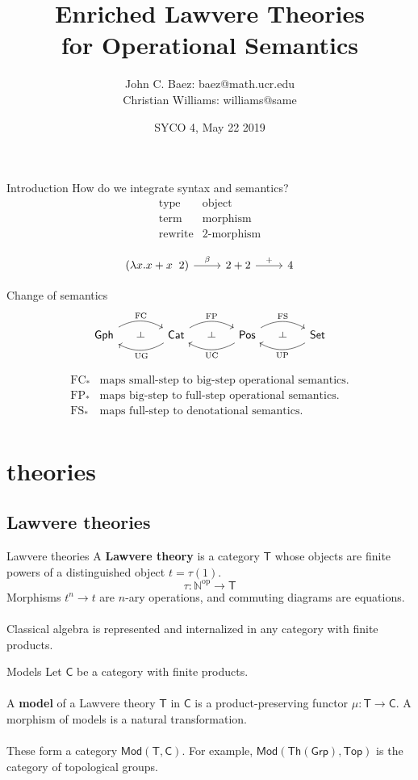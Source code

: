 \documentclass{beamer}
\title{Enriched Lawvere Theories\\ for Operational Semantics}
\author{John C. Baez: baez@math.ucr.edu\\ Christian Williams: williams@same}
\institute{University of California, Riverside}
\date{SYCO 4, May 22 2019}
\def\ld{\rotatebox[origin=c]{-90}{$\dashv$}} %
\newcommand{\Th}{\mathsf{Th}}
\newcommand{\Gph}{\mathsf{Gph}}
\newcommand{\Set}{\mathsf{Set}}
\newcommand{\Grp}{\mathsf{Grp}}
\newcommand{\Cat}{\mathsf{Cat}}
\newcommand{\Top}{\mathsf{Top}}
\newcommand{\Pos}{\mathsf{Pos}}
\newcommand{\Mod}{\mathsf{Mod}}
\newcommand{\C}{\mathsf{C}}
\newcommand{\T}{\mathsf{T}}
\newcommand{\FC}{\mathrm{FC}}
\newcommand{\FP}{\mathrm{FP}}
\newcommand{\FS}{\mathrm{FS}}
\newcommand{\UC}{\mathrm{UC}}
\newcommand{\UP}{\mathrm{UP}}
\newcommand{\UG}{\mathrm{UG}}
\newcommand{\op}{\mathrm{op}}
\newcommand{\maps}{\colon}
\begin{document}
\frame{\titlepage}

\begin{frame}{Introduction}
  How do we integrate syntax and semantics?
  \[\begin{array}{ll}
      \text{type} & \text{object}\\
      \text{term} & \text{morphism}\\
      \text{rewrite} & \text{2-morphism}\\
    \end{array}\]
  \[\begin{tikzcd}[ampersand replacement=\&]
      (\lambda x.x+x \; \; 2) \ar{r}{\beta} \& 2+2 \ar{r}{+} \& 4
    \end{tikzcd}\]
\end{frame}
\begin{frame}{Change of semantics}
  \[\begin{tikzcd}[column sep=small, ampersand replacement=\&]
\Gph \arrow[bend left,below]{rr}{\FC}
\& \ld \&
\arrow[bend left,above]{ll}{\UG} \Cat \arrow[bend left,below]{rr}{\FP}
\& \ld \&
\arrow[bend left,above]{ll}{\UC} \Pos \arrow[bend left,below]{rr}{\FS}
\& \ld \&
\Set \arrow[bend left,above]{ll}{\UP}
\end{tikzcd}\]

\[\begin{array}{ll}
    \FC_* & \text{maps small-step to big-step operational semantics.}\\
    \FP_* & \text{maps big-step to full-step operational semantics.}\\
    \FS_* & \text{maps full-step to denotational semantics.}\\
\end{array}\]

\end{frame}

\section{theories}
\subsection{Lawvere theories}
\begin{frame}{Lawvere theories}
  A \textbf{Lawvere theory} is a category $\T$ whose objects are finite powers of a distinguished object $t = \tau(1)$.
  $$\tau\maps \mathbb{N}^{\op}\to \T$$
  Morphisms $t^n\to t$ are $n$-ary operations, and commuting diagrams are equations.\\~\\
  Classical algebra is represented and internalized in any category with finite products.
\end{frame}
\begin{frame}{Models}
  Let $\C$ be a category with finite products.\\~\\
  A \textbf{model} of a Lawvere theory $\T$ in $\C$ is a product-preserving functor $\mu\maps \T\to \C$. A morphism of models is a natural transformation. \\~\\
  These form a category $\Mod(\T,\C)$. For example, $\Mod(\Th(\Grp),\Top)$ is the category of topological groups.
\end{frame}
\end{document}
